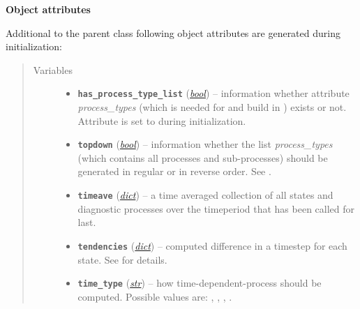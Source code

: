 \documentclass[letterpaper,10pt,english]{sphinxmanual}
\begin{document}
\begin{fulllineitems}
\begin{quote}
\begin{description}
\begin{itemize}
\end{itemize}

\end{description}\end{quote}

\textbf{Object attributes}

Additional to the parent class {\hyperref[api/climlab.process:climlab.process.process.Process]{\emph{}}}
following object attributes are generated during initialization:
\begin{quote}\begin{description}
\item[{Variables}] \leavevmode\begin{itemize}
\item {} 
\textbf{\texttt{has\_process\_type\_list}} (\href{http://docs.python.org/2.7/library/functions.html\#bool}{\emph{bool}}) -- information whether attribute \emph{process\_types} 
(which is needed for {\hyperref[api/climlab.process:climlab.process.time_dependent_process.TimeDependentProcess.compute]{\emph{}}} and build in
)
exists or not. Attribute is set to  
during initialization.

\item {} 
\textbf{\texttt{topdown}} (\href{http://docs.python.org/2.7/library/functions.html\#bool}{\emph{bool}}) -- information whether the list \emph{process\_types} (which 
contains all processes and sub-processes) should be 
generated in regular or in reverse order.
See .

\item {} 
\textbf{\texttt{timeave}} (\href{http://docs.python.org/2.7/library/stdtypes.html\#dict}{\emph{dict}}) -- a time averaged collection of all states and diagnostic 
processes over the timeperiod that 
{\hyperref[api/climlab.process:climlab.process.time_dependent_process.TimeDependentProcess.integrate_years]{\emph{}}} has been called for last.

\item {} 
\textbf{\texttt{tendencies}} (\href{http://docs.python.org/2.7/library/stdtypes.html\#dict}{\emph{dict}}) -- computed difference in a timestep for each state. 
See {\hyperref[api/climlab.process:climlab.process.time_dependent_process.TimeDependentProcess.compute]{\emph{}}} for details.

\item {} 
\textbf{\texttt{time\_type}} (\href{http://docs.python.org/2.7/library/functions.html\#str}{\emph{str}}) -- how time-dependent-process should be computed. 
Possible values are: , ,
, .


\end{itemize}
\end{description}
\end{quote}
\end{fulllineitems}
\end{document}
